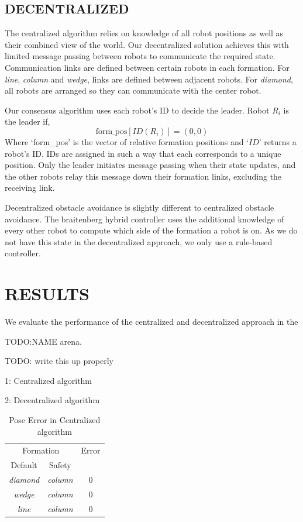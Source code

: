 \documentclass[letterpaper, 10 pt, conference]{ieeeconf}  %
\begin{document}
\subsection{DECENTRALIZED}

The centralized algorithm relies on knowledge of all robot positions as well as their combined view of the world. Our decentralized solution achieves this with limited message passing between robots to communicate the required state. Communication links are defined between certain robots in each formation. For \textit{line}, \textit{column} and \textit{wedge}, links are defined between adjacent robots. For \textit{diamond}, all robots are arranged so they can communicate with the center robot.

Our consensus algorithm uses each robot's ID to decide the leader. Robot $R_i$ is the leader if,
\[\text{form\_pos}[ID(R_i)] = (0,0)\]
Where `form\_pos' is the vector of relative formation positions and `$ID$' returns a robot's ID. IDs are assigned in such a way that each corresponds to a unique position. Only the leader initiates message passing when their state updates, and the other robots relay this message down their formation links, excluding the receiving link.

Decentralized obstacle avoidance is slightly different to centralized obstacle avoidance. The braitenberg hybrid controller uses the additional knowledge of every other robot to compute which side of the formation a robot is on. As we do not have this state in the decentralized approach, we only use a rule-based controller.

\section{RESULTS}

We evaluate the performance of the centralized and decentralized approach in the

TODO:NAME arena.

TODO: write this up properly

1: Centralized algorithm

2: Decentralized algorithm
	
\begin{table}[h]
\begin{center}
\begin{tabular}{|c c|c|}
\hline
\multicolumn{2}{|c|}{Formation} & Error \\
Default & Safety & \\
\hline
\textit{diamond}    & \textit{column} & 0 \\
\textit{wedge}       & \textit{column} & 0 \\
\textit{line}           & \textit{column} & 0 \\
\hline
\end{tabular}
\end{center}
\caption{Pose Error in Centralized algorithm}
\label{table_results_centralized}
\end{table}
\end{document}

